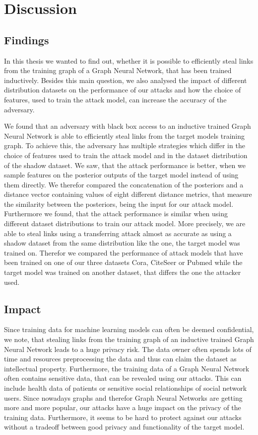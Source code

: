 \chapter{Discussion}

    \section{Findings}
        In this thesis we wanted to find out, whether it is possible to efficiently steal links from the training graph of a Graph Neural Network, that has been trained inductively.
        Besides this main question, we also analysed the impact of different distribution datasets on the performance of our attacks and how the choice of features, used to train the attack model, can increase the accuracy of the adversary.

        We found that an adversary with black box access to an inductive trained Graph Neural Network is able to efficiently steal links from the target models training graph.
        To achieve this, the adversary has multiple strategies which differ in the choice of features used to train the attack model and in the dataset distribution of the shadow dataset.
        We saw, that the attack performance is better, when we sample features on the posterior outputs of the target model instead of using them directly.
        We therefor compared the concatenation of the posteriors and a distance vector containing values of eight different distance metrics, that measure the similarity between the posteriors, being the input for our attack model.
        Furthermore we found, that the attack performance is similar when using different dataset distributions to train our attack model.
        More precisely, we are able to steal links using a transferring attack almost as accurate as using a shadow dataset from the same distribution like the one, the target model was trained on.
        Therefor we compared the performance of attack models that have been trained on one of our three datasets Cora, CiteSeer or Pubmed while the target model was trained on another dataset, that differs the one the attacker used.

    \section{Impact}
        Since training data for machine learning models can often be deemed confidential, we note, that stealing links from the training graph of an inductive trained Graph Neural Network leads to a huge privacy risk.
        The data owner often spends lots of time and resources preprocessing the data and thus can claim the dataset as intellectual property.
        Furthermore, the training data of a Graph Neural Network often contains sensitive data, that can be revealed using our attacks.
        This can include health data of patients or sensitive social relationships of social network users.
        Since nowadays graphs and therefor Graph Neural Networks are getting more and more popular, our attacks have a huge impact on the privacy of the training data.
        Furthermore, it seems to be hard to protect against our attacks without a tradeoff between good privacy and functionality of the target model. 

